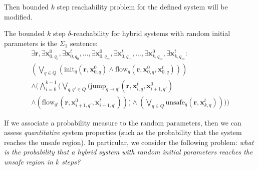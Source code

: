 Then bounded $k$ step reachability problem for the defined system will be modified.
\begin{definition}
The bounded $k$ step $\delta$-reachability for hybrid systems with random initial parameters 
is the $\Sigma_1$ sentence:
\begin{equation*} %
\begin{split}
\exists \textbf{r}, \exists \textbf{x}^{0}_{0,q_0}, \exists \textbf{x}^t_{0,q_0}, ... , \exists \textbf{x}^{0}_{0,q_m}, \exists \textbf{x}^t_{0,q_m} , ... , \exists \textbf{x}^{0}_{k,q_m}, \exists \textbf{x}^t_{k,q_m}:\\
(\bigvee_{q \in Q} (\text{init}_{q}(\textbf{r}, \textbf{x}^{0}_{0,q}) \wedge \text{flow}_{q}(\textbf{r}, \textbf{x}^{0}_{0,q},\textbf{x}^t_{0,q}))) \\
\wedge (\bigwedge_{i=0}^{k-1} (\bigvee_{q,q' \in Q}(\text{jump}_{q \rightarrow q'}(\textbf{r}, \textbf{x}^t_{i,q}, \textbf{x}^{0}_{i+1,q'}) \\
\wedge (\text{flow}_{q'}(\textbf{r}, \textbf{x}^{0}_{i+1,q'}, \textbf{x}^t_{i+1,q'}))) \wedge (\bigvee_{q \in Q} \text{unsafe}_{q}(\textbf{r}, \textbf{x}^t_{k,q}))))
\end{split}
\end{equation*}
\end{definition}

If we associate a probability measure to the random parameters, then we can assess {\em quantitative} 
system properties (such as the probability that the system reaches the unsafe region).
In particular, we consider the following problem: 
\textit{what is the probability that a hybrid system with random initial parameters reaches the 
unsafe region in $k$ steps?}

